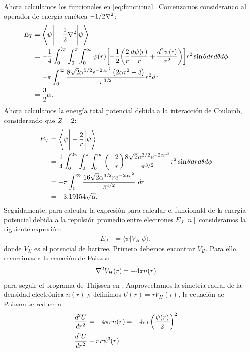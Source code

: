 \documentclass[11pt,letterpaper]{article}
\begin{document}
Ahora calculamos los funcionales en \eqref{eq:functional}. Comenzamos
considerando al operador de energía cinética $-1/2\laplacian{}$:
\begin{subequations}\label{T:energy}
\begin{align}
E_T&=\Bigg\langle \psi \Bigg|-\frac{1}{2}\nabla^2\Bigg| \psi \Bigg\rangle\\
&=-\frac{1}{4}\int_0^{2\pi}\int_{0}^{\pi}\int_{0}^{\infty}\psi(r) \qty[-\frac{1}{2}\qty(\frac{2}{r}\frac{d\psi(r)}{r}+\frac{d^2\psi(r)}{r^2})]r^2\sin \theta drd\theta d\phi\\
&=-\pi\int_0^{\infty} \frac{8 \sqrt{2} \alpha ^{5/2} e^{-2 \alpha  r^2} \left(2 \alpha  r^2-3\right)}{\pi ^{3/2}}r^2dr\\
&=\frac{3}{2}\alpha.
\end{align}
\end{subequations}
Ahora calculamos la energía total potencial debida a la interacción de 
Coulomb, considerando que $Z=2$:
\begin{subequations}\label{V:energy}
\begin{align}
E_V&=\Bigg\langle \psi \Bigg|-\frac{2}{r}\Bigg| \psi \Bigg\rangle\\
&=\frac{1}{4}\int_0^{2\pi}\int_{0}^{\pi}\int_{0}^{\infty}\qty(-\frac{2}{r})\frac{8 \sqrt{2} \alpha ^{3/2} e^{-2 \alpha  r^2}}{\pi ^{3/2}} r^2\sin \theta drd\theta d\phi\\
&=-\pi\int_0^{\infty}\frac{16 \sqrt{2} \alpha ^{3/2} r e^{-2 \alpha  r^2}}{\pi ^{3/2}}\  dr\\
&=-3.19154\sqrt{\alpha}.
\end{align}
\end{subequations}
Seguidamente, para calcular 
la expresión para calcular el funcionald de la energía potencial 
debida a la repulsión promedio entre electrones
$E_J[n]$ consideramos la siguiente expresión:
\begin{align}
E_J&=\Big\langle \psi \Big|V_H\Big| \psi \Big\rangle,
\end{align}
donde $V_H$ es el potencial de hartree. Primero debemos
encontrar $V_H$. Para ello, recurrimos a la ecuación de Poisson
\begin{align}
\laplacian{V_H(r)}=-4\pi n(r)
\end{align}
para seguir el programa de Thijssen en \cite{thijssen2007computational}.
Aaprovechamos la simetría radial de 
la densidad electrónica $n(r)$ y definimos $U(r)=rV_H(r)$, la ecuación de Poisson se reduce a
\begin{align}
\frac{d^2 U}{dr^2}&=-4\pi r n(r)=-4\pi r \qty(\frac{\psi(r)}{2})^2\\
\frac{d^2 U}{dr^2}&-\pi r \psi^2(r)
\end{align}
\end{document}
